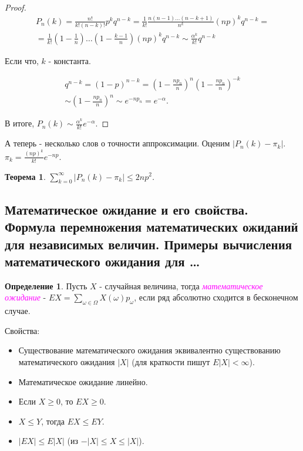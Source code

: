\documentclass[a4paper,100pt]{article}
\theoremstyle{indented}
\newtheorem{theorem}{Теорема}
\theoremstyle{definition}
\newtheorem{defn}{Определение}
\theoremstyle{remark}
\begin{document}
\begin{proof}
  \begin{equation*}
      \begin{split}
          P_n(k)=\frac{n!}{k!(n-k)!}p^kq^{n-k}=\frac{1}{k!}\frac{n(n-1)\ldots(n-k+1)}{n^k}(np)^kq^{n-k}= \\ 
          = \frac{1}{k!}{(1-\frac{1}{n})\ldots(1-\frac{k-1}{n})}(np)^kq^{n-k}\sim\frac{\alpha^k}{k!}q^{n-k}
      \end{split}
  \end{equation*}

  Если что, $k$ - константа. 

  \begin{equation*}
      \begin{split}
          q^{n-k}=(1-p)^{n-k}=(1-\frac{n p_n}{n})^n(1-\frac{n p_n}{n})^{-k} \\ 
          \sim (1-\frac{n p_n}{n})^n \sim e^{-n p_n} = e^{-\alpha}. 
      \end{split}
  \end{equation*}

  В итоге, $P_n(k)\sim\frac{\alpha^k}{k!}e^{-\alpha}$. 

\end{proof}

А теперь - несколько слов о точности аппроксимации. Оценим $|P_n(k)-\pi_k|$. $\pi_k=\frac{(np)^k}{k!}e^{-np}$. \\

\begin{theorem}
  $\sum_{k=0}^\infty|P_n(k)-\pi_k|\leq 2np^2$.
\end{theorem}

\subsection{Математическое ожидание и его свойства. Формула перемножения математических ожиданий для независимых величин. Примеры вычисления математического ожидания для \ldots} 

\begin{defn}
  Пусть $X$ - случайная величина, тогда \hypertarget{n13}{\textcolor{magenta}{\textit{математическое ожидание}}} - $EX = \sum_{\omega \in \Omega} X(\omega)p_\omega$, если ряд абсолютно сходится в бесконечном случае.
\end{defn}

Свойства: \\ 

\begin{itemize}
  \item Существование математического ожидания эквивалентно существованию математического ожидания $|X|$ (для краткости пишут $E|X|<\infty$). 
  \item Математическое ожидание линейно.
  \item Если $X\geq 0$, то $EX\geq 0$. 
  \item $X\leq Y$, тогда $EX\leq EY$. 
  \item $|EX|\leq E|X|$ (из $-|X|\leq X \leq |X|$). 
\end{itemize}
\end{document}
